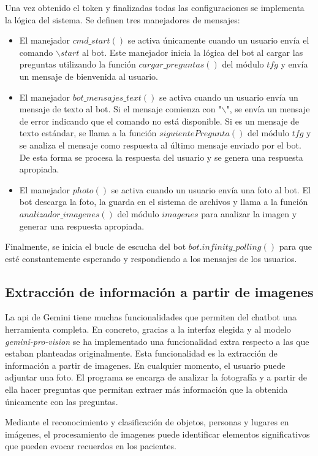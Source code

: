 Una vez obtenido el token y finalizadas todas las configuraciones se implementa la lógica del sistema. Se definen tres manejadores de mensajes:
\begin{itemize}
	\item El manejador $cmd\_start()$ se activa únicamente cuando un usuario envía el comando $\backslash start$ al bot. Este manejador inicia la lógica del bot al cargar las preguntas utilizando la función $cargar\_preguntas()$ del módulo $tfg$ y envía un mensaje de bienvenida al usuario.
	
	\item El manejador $bot\_mensajes\_text()$ se activa cuando un usuario envía un mensaje de texto al bot. Si el mensaje comienza con "$\backslash$", se envía un mensaje de error indicando que el comando no está disponible. Si es un mensaje de texto estándar, se llama a la función $siguientePregunta()$ del módulo $tfg$ y se analiza el mensaje como respuesta al último mensaje enviado por el bot. De esta forma se procesa la respuesta del usuario y se genera una respuesta apropiada.
	
	\item El manejador $photo()$ se activa cuando un usuario envía una foto al bot. El bot descarga la foto, la guarda en el sistema de archivos y llama a la función $analizador\_imagenes()$ del módulo $imagenes$ para analizar la imagen y generar una respuesta apropiada.
\end{itemize}

Finalmente, se inicia el bucle de escucha del bot $bot.infinity\_polling()$ para que esté constantemente esperando y respondiendo a los mensajes de los usuarios.


\subsection{Extracción de información a partir de imagenes}
\label{sec:imagenes}
La api de Gemini tiene muchas funcionalidades que permiten del chatbot una herramienta completa. En concreto, gracias a la interfaz elegida y al modelo \textit{gemini-pro-vision} se ha implementado una funcionalidad extra respecto a las que estaban planteadas originalmente. Esta funcionalidad es la extracción de información a partir de imagenes. En cualquier momento, el usuario puede adjuntar una foto. El programa se encarga de analizar la fotografía y a partir de ella hacer preguntas que permitan extraer más información que la obtenida únicamente con las preguntas.

Mediante el reconocimiento y clasificación de objetos, personas y lugares en imágenes, el procesamiento de imagenes puede identificar elementos significativos que pueden evocar recuerdos en los pacientes. 

